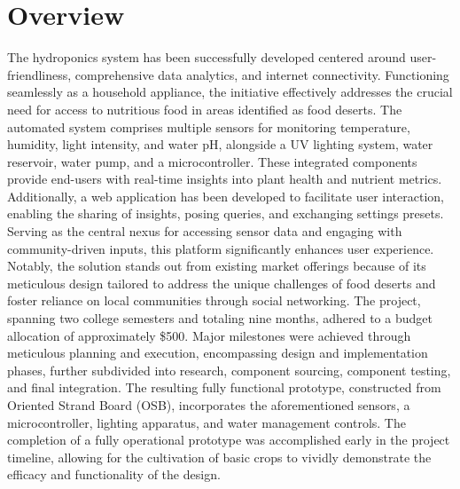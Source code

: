 \documentclass[12pt]{article} %
\newcommand{\comment}[1]{} %
\begin{document}
\section*{Overview}
\noindent The hydroponics system has been successfully developed centered around user-friendliness, comprehensive data analytics, and internet connectivity. Functioning seamlessly as a household appliance, the initiative effectively addresses the crucial need for access to nutritious food in areas identified as food deserts. The automated system comprises multiple sensors for monitoring temperature, humidity, light intensity, and water pH, alongside a UV lighting system, water reservoir, water pump, and a microcontroller. These integrated components provide end-users with real-time insights into plant health and nutrient metrics.
\newline
\newline
\noindent Additionally, a web application has been developed to facilitate user interaction, enabling the sharing of insights, posing queries, and exchanging settings presets. Serving as the central nexus for accessing sensor data and engaging with community-driven inputs, this platform significantly enhances user experience. Notably, the solution stands out from existing market offerings because of its meticulous design tailored to address the unique challenges of food deserts and foster reliance on local communities through social networking.
\newline
\newline
\noindent The project, spanning two college semesters and totaling nine months, adhered to a budget allocation of approximately \$500. Major milestones were achieved through meticulous planning and execution, encompassing design and implementation phases, further subdivided into research, component sourcing, component testing, and final integration. The resulting fully functional prototype, constructed from Oriented Strand Board (OSB), incorporates the aforementioned sensors, a microcontroller, lighting apparatus, and water management controls. The completion of a fully operational prototype was accomplished early in the project timeline, allowing for the cultivation of basic crops to vividly demonstrate the efficacy and functionality of the design.

\comment{


\section*{Dedication}
\addcontentsline{toc}{section}{Dedication}
\lipsum[1] %


}
\end{document}
